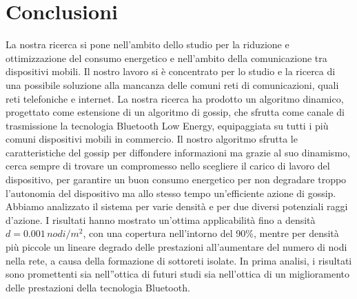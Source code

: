 \chapter{Conclusioni}
\label{chap:conclusioni}

La nostra ricerca si pone nell'ambito dello studio per la riduzione e ottimizzazione del consumo energetico e nell'ambito della comunicazione tra dispositivi mobili.  Il nostro lavoro si è concentrato per lo studio e la ricerca di una possibile soluzione alla mancanza delle comuni reti di comunicazioni, quali reti telefoniche e internet. La nostra ricerca ha prodotto un algoritmo dinamico, progettato come estensione di un algoritmo di gossip, che sfrutta come canale di trasmissione la tecnologia Bluetooth Low Energy, equipaggiata su tutti i più comuni dispositivi mobili in commercio. Il nostro algoritmo sfrutta le caratteristiche del gossip per diffondere informazioni ma grazie al suo dinamismo, cerca sempre di trovare un compromesso nello scegliere il carico di lavoro del dispositivo, per garantire un buon consumo energetico per non degradare troppo l'autonomia del dispositivo ma allo stesso tempo un'efficiente azione di gossip. Abbiamo analizzato il sistema per varie densità e per due diversi potenziali raggi d'azione. I risultati hanno mostrato un'ottima applicabilità fino a densità $d=0.001\, nodi/m^2$, con una copertura nell'intorno del 90\%, mentre per densità più piccole un lineare degrado delle prestazioni all'aumentare del numero di nodi nella rete, a causa della formazione di sottoreti isolate. In prima analisi, i risultati sono promettenti sia nell''ottica di futuri studi sia nell'ottica di un miglioramento delle prestazioni della tecnologia Bluetooth.